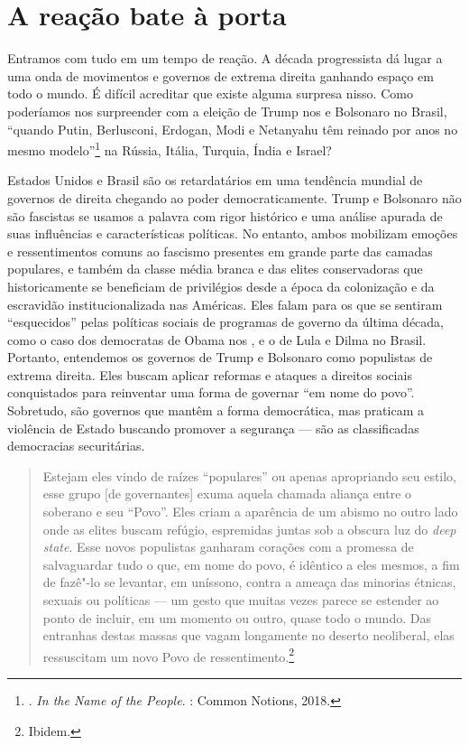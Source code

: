 


\section{A reação bate à porta}

Entramos com tudo em um tempo de reação. A década progressista dá lugar a uma onda de movimentos e governos de extrema direita ganhando espaço em todo o mundo. É difícil acreditar que existe alguma surpresa nisso. Como poderíamos nos surpreender com a eleição de Trump nos  e Bolsonaro no Brasil, ``quando Putin, Berlusconi, Erdogan, Modi e Netanyahu têm reinado por anos no mesmo modelo''\footnote{. \emph{In the Name of the People}. : Common Notions, 2018.} na Rússia, Itália, Turquia, Índia e Israel?

Estados Unidos e Brasil são os retardatários em uma tendência mundial de governos de direita chegando ao poder democraticamente. Trump e Bolsonaro não são fascistas se usamos a palavra com rigor histórico e uma análise apurada de suas influências e características políticas. No entanto, ambos mobilizam emoções e ressentimentos comuns ao fascismo presentes em grande parte das camadas populares, e também da classe média branca e das elites conservadoras que historicamente se beneficiam de privilégios desde a época da colonização e da escravidão institucionalizada nas Américas. Eles falam para os que se sentiram ``esquecidos'' pelas políticas sociais de programas de governo da última década, como o caso dos democratas de Obama nos , e o  de Lula e Dilma no Brasil. Portanto, entendemos os governos de Trump e Bolsonaro como populistas de extrema direita. Eles buscam aplicar reformas e ataques a direitos sociais conquistados para reinventar uma forma de governar ``em nome do povo''. Sobretudo, são governos que mantêm a forma democrática, mas praticam a violência de Estado buscando promover a segurança --- são as classificadas democracias securitárias.

\begin{quote}
Estejam eles vindo de raízes ``populares'' ou apenas apropriando seu estilo, esse grupo [de governantes] exuma aquela chamada aliança entre o soberano e seu ``Povo''. Eles criam a aparência de um abismo no outro lado onde as elites buscam refúgio, espremidas juntas sob a obscura luz do \emph{deep state}. Esse novos populistas ganharam corações com a promessa de salvaguardar tudo o que, em nome do povo, é idêntico a eles mesmos, a fim de fazê"-lo se levantar, em uníssono, contra a ameaça das minorias étnicas, sexuais ou políticas --- um gesto que muitas vezes parece se estender ao ponto de incluir, em um momento ou outro, quase todo o mundo. Das entranhas destas massas que vagam longamente no deserto neoliberal, elas ressuscitam um novo Povo de ressentimento.\footnote{Ibidem.}
\end{quote}

